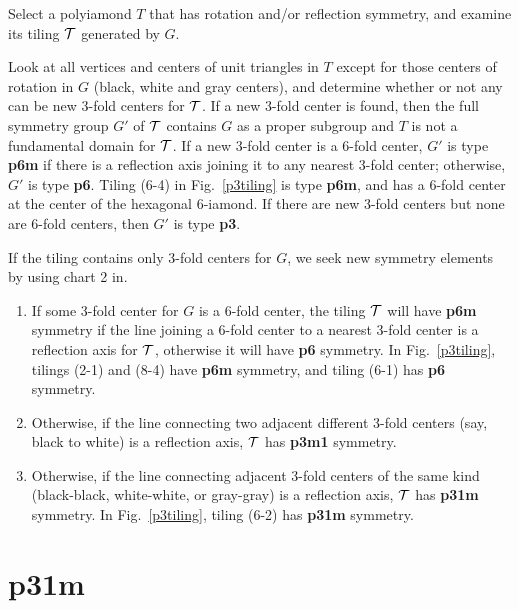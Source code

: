 \documentclass{ws-ijcga}
\begin{document}
\begin{itemlist}
\item
Select a polyiamond $T$ that has rotation and/or reflection symmetry, and examine its tiling
$\cal T$ generated by $G$.
\item
Look at all vertices and centers of unit triangles in $T$ except for those centers of rotation in
$G$ (black, white and gray centers), and determine whether or not any can be new 3-fold centers
for $\cal T$. 
If a new 3-fold center is found, then the full symmetry group $G'$ of $\cal T$ contains $G$ as a
proper subgroup and $T$ is not a fundamental domain for $\cal T$. 
If a new 3-fold center is a 6-fold
center, $G'$ is type {\bf p6m} if there is a reflection axis joining it to any nearest 3-fold center;
otherwise, $G'$ is type {\bf p6}. 
Tiling (6-4) in Fig.~\ref{p3tiling} is type {\bf p6m}, and has a 6-fold center at the center
of the hexagonal 6-iamond. 
If there are new 3-fold centers but none are 6-fold centers, then $G'$ is type {\bf p3}.
\item
If the tiling contains only 3-fold centers for $G$, 
we seek new symmetry elements by using chart 2 in\cite{schatt}. \begin{enumerate}
\item
If some 3-fold center for $G$ is a 6-fold center, 
the tiling $\cal T$ will have {\bf p6m} symmetry if the
line joining a 6-fold center to a nearest 3-fold center is a reflection axis for $\cal T$, 
otherwise it will have {\bf p6} symmetry. 
In Fig.~\ref{p3tiling}, tilings (2-1) and (8-4) have {\bf p6m} symmetry, 
and tiling (6-1) has {\bf p6} symmetry.
\item
Otherwise, if the line connecting two adjacent different 3-fold centers 
(say, black to white) is a reflection axis, $\cal T$ has {\bf p3m1} symmetry.
\item
Otherwise, if the line connecting adjacent 3-fold centers of the same kind 
(black-black, white-white, or gray-gray) is a reflection axis, 
$\cal T$ has {\bf p31m} symmetry. 
In Fig.~\ref{p3tiling}, tiling (6-2) has {\bf p31m} symmetry.
\end{enumerate}
\end{itemlist}











\section{{\bf p31m}}
\label{p31m}
\end{document}
